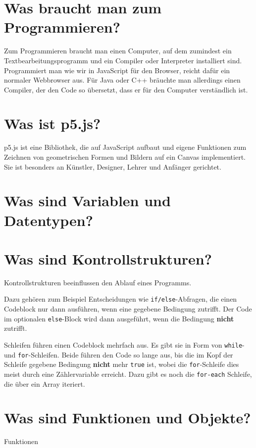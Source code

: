 \documentclass[12pt]{report}
\begin{document}
    \section{Was braucht man zum Programmieren?}
    Zum Programmieren braucht man einen Computer, auf dem zumindest ein
    Textbearbeitungsprogramm und ein Compiler oder Interpreter installiert
    sind. Programmiert man wie wir in JavaScript für den Browser, reicht
    dafür ein normaler Webbrowser aus. Für Java oder C++ bräuchte man allerdings
    einen Compiler, der den Code so übersetzt, dass er für den Computer
    verständlich ist.

    \section{Was ist p5.js?}
    p5.js ist eine Bibliothek, die auf JavaScript aufbaut und eigene Funktionen
    zum Zeichnen von geometrischen Formen und Bildern auf ein Canvas implementiert.
    Sie ist besonders an Künstler, Designer, Lehrer und Anfänger gerichtet.

    \section{Was sind Variablen und Datentypen?}

    \section{Was sind Kontrollstrukturen?}
    Kontrollstrukturen beeinflussen den Ablauf eines Programms.

    Dazu gehören zum Beispiel Entscheidungen wie \texttt{if/else}-Abfragen, die einen Codeblock nur dann
    ausführen, wenn eine gegebene Bedingung zutrifft. Der Code im optionalen \texttt{else}-Block
    wird dann ausgeführt, wenn die Bedingung \textbf{nicht} zutrifft.

    Schleifen führen einen Codeblock mehrfach aus. Es gibt sie in Form von
    \texttt{while}- und \texttt{for}-Schleifen. Beide führen den Code so lange aus,
    bis die im Kopf der Schleife gegebene Bedingung \textbf{nicht} mehr \texttt{true} ist,
    wobei die \texttt{for}-Schleife dies meist durch eine Zählervariable erreicht.
    Dazu gibt es noch die \texttt{for-each} Schleife, die über ein Array iteriert.

    \section{Was sind Funktionen und Objekte?}
    Funktionen
\end{document}
